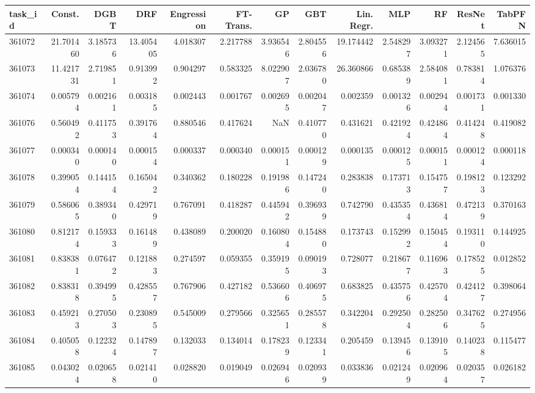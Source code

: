 \begin{tabular}{lrrrrrrrrrrrr}
\toprule
task\_id & Const. & DGBT & DRF & Engression & FT-Trans. & GP & GBT & Lin. Regr. & MLP & RF & ResNet & TabPFN \\
\midrule
361072 & 21.701460 & 3.185736 & 13.405405 & 4.018307 & 2.217788 & 3.936546 & 2.804556 & 19.174442 & 2.548297 & 3.093271 & 2.124565 & 7.636015 \\
361073 & 11.421731 & 2.719851 & 0.913992 & 0.904297 & 0.583325 & 8.022907 & 2.036780 & 26.360866 & 0.685389 & 2.584081 & 0.783814 & 1.076376 \\
361074 & 0.005794 & 0.002161 & 0.003185 & 0.002443 & 0.001767 & 0.002695 & 0.002047 & 0.002359 & 0.001326 & 0.002944 & 0.001731 & 0.001330 \\
361076 & 0.560492 & 0.411753 & 0.391764 & 0.880546 & 0.417624 & NaN & 0.410770 & 0.431621 & 0.421924 & 0.424864 & 0.414248 & 0.419082 \\
361077 & 0.000340 & 0.000140 & 0.000154 & 0.000337 & 0.000340 & 0.000151 & 0.000129 & 0.000135 & 0.000125 & 0.000151 & 0.000124 & 0.000118 \\
361078 & 0.399054 & 0.144154 & 0.165042 & 0.340362 & 0.180228 & 0.191986 & 0.147240 & 0.283838 & 0.173713 & 0.154757 & 0.198123 & 0.123292 \\
361079 & 0.586065 & 0.389340 & 0.429719 & 0.767091 & 0.418287 & 0.445942 & 0.396939 & 0.742790 & 0.435354 & 0.436814 & 0.472139 & 0.370163 \\
361080 & 0.812174 & 0.159333 & 0.161489 & 0.438089 & 0.200020 & 0.160804 & 0.154880 & 0.173743 & 0.152992 & 0.150454 & 0.193110 & 0.144925 \\
361081 & 0.838381 & 0.076472 & 0.121883 & 0.274597 & 0.059355 & 0.359195 & 0.090193 & 0.728077 & 0.218677 & 0.116963 & 0.178525 & 0.012852 \\
361082 & 0.838318 & 0.394995 & 0.428557 & 0.767906 & 0.427182 & 0.536606 & 0.406975 & 0.683825 & 0.435756 & 0.425704 & 0.424127 & 0.398064 \\
361083 & 0.459213 & 0.270503 & 0.230895 & 0.545009 & 0.279566 & 0.325651 & 0.285578 & 0.342204 & 0.292504 & 0.282506 & 0.347625 & 0.274956 \\
361084 & 0.405058 & 0.122324 & 0.147897 & 0.132033 & 0.134014 & 0.178239 & 0.123341 & 0.205459 & 0.139456 & 0.139105 & 0.140238 & 0.115477 \\
361085 & 0.043024 & 0.020658 & 0.021410 & 0.028820 & 0.019049 & 0.026946 & 0.020939 & 0.033836 & 0.021249 & 0.020964 & 0.020357 & 0.026182 \\

\end{tabular}
